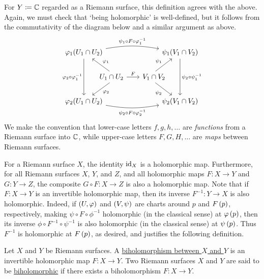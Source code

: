 \documentclass[../Moduli_Spaces_of_Riemann_Surfaces.tex]{subfiles}
\begin{document}
    \begin{remark}
        For $Y\coloneqq\mathbb{C}$ regarded as a Riemann surface, this definition agrees with the above. Again, we must check that $\textrm{`}$being holomorphic$\textrm{'}$ is well-defined, but it follows from the commutativity of the diagram below and a similar argument as above.
        \begin{equation*}
            \begin{tikzcd}[column sep = 0.05in]
                \phi_1\!\l(U_1\cap U_2\r) \ar[rrrrrrr, "\psi_1\circ F\circ\phi_1^{-1}", bend left = 10] \ar[dd, "\phi_2\circ\phi_1^{-1}"'] & & & & & & & \psi_1\!\l(V_1\cap V_2\r) \ar[dd, "\psi_2\circ\psi_1^{-1}"] \\
                & \hspace{-0.23in}U_1\cap U_2 \ar[ul, "\phi_1"'] \ar [dl, "\phi_2"] \ar[rrrrr, "F"] & & & & & V_1\cap V_2\hspace{-0.23in} \ar[ur, "\psi_1"] \ar[dr, "\psi_2"'] \\
                \phi_2\!\l(U_1\cap U_2\r) \ar[rrrrrrr, "\psi_2\circ F\circ\phi_2^{-1}"', bend right = 10] & & & & & & & \psi_2\!\l(V_1\cap V_2\r)
            \end{tikzcd}
        \end{equation*}
        We make the convention that lower-case letters $f,g,h,\dots$ are \textit{functions} from a Riemann surface into $\mathbb{C}$, while upper-case letters $F,G,H,\dots$ are \textit{maps} between Riemann surfaces.\exqed
    \end{remark}
    \begin{example}
        For a Riemann surface $X$, the identity $\operatorname{id}_X$ is a holomorphic map. Furthermore, for all Riemann surfaces $X$, $Y$, and $Z$, and all holomorphic maps $F:X\to Y$ and $G:Y\to Z$, the composite $G\circ F:X\to Z$ is also a holomorphic map. Note that if $F:X\to Y$ is an invertible holomorphic map, then its inverse $F^{-1}:Y\to X$ is also holomorphic. Indeed, if $\left(U,\varphi\right)$ and $\left(V,\psi\right)$ are charts around $p$ and $F\left(p\right)$, respectively, making $\psi\circ F\circ\phi^{-1}$ holomorphic (in the classical sense) at $\varphi\left(p\right)$, then its inverse $\phi\circ F^{-1}\circ\psi^{-1}$ is also holomorphic (in the classical sense) at $\psi\left(p\right)$. Thus $F^{-1}$ is holomorphic at $F\left(p\right)$, as desired, and justifies the following definition.\exqed
    \end{example}
    \begin{definition}\label{RS:def:biholomorphic_Riemann_surfaces}
        Let $X$ and $Y$ be Riemann surfaces. A \ul{biholomorphism between $X$ and $Y$} is an invertible holomorphic map $F:X\to Y$. Two Riemann surfaces $X$ and $Y$ are said to be \ul{biholomorphic} if there exists a biholomorphism $F:X\to Y$.
    \end{definition}
\end{document}
